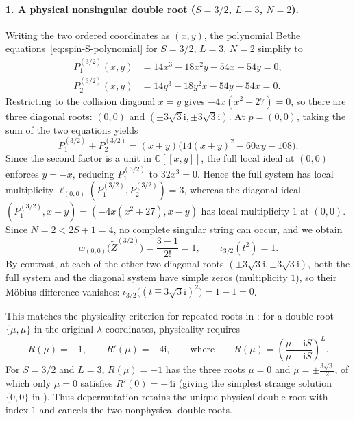 \documentclass[11pt]{article}
\theoremstyle{definition}
\newcommand{\ii}{\mathrm{i}}
\newcommand{\C}{\mathbb{C}}
\begin{document}
\paragraph{1. A physical nonsingular double root ($S=3/2$, $L=3$, $N=2$).}
Writing the two ordered coordinates as $(x,y)$, the polynomial Bethe equations~\eqref{eq:spin-S-polynomial} for $S=3/2$, $L=3$, $N=2$ simplify to
\[
 \begin{aligned}
 P_1^{(3/2)}(x,y)&=14x^3-18x^2y-54x-54y=0,\\
 P_2^{(3/2)}(x,y)&=14y^3-18y^2x-54y-54x=0.
 \end{aligned}
\]
Restricting to the collision diagonal $x=y$ gives $-4x(x^2+27)=0$, so there are three diagonal roots: $(0,0)$ and $(\pm 3\sqrt{3}\ii,\pm 3\sqrt{3}\ii)$.
At $p=(0,0)$, taking the sum of the two equations yields
\[
 P_1^{(3/2)}+P_2^{(3/2)}
 =(x+y)\bigl(14(x+y)^2-60xy-108\bigr).
\]
Since the second factor is a unit in $\C[[x,y]]$, the full local ideal at $(0,0)$ enforces $y=-x$, reducing $P_1^{(3/2)}$ to $32x^3=0$. Hence the full system has local multiplicity $\ell_{(0,0)}(P_1^{(3/2)},P_2^{(3/2)})=3$, whereas the diagonal ideal $(P_1^{(3/2)},x-y)=(-4x(x^2+27),x-y)$ has local multiplicity $1$ at $(0,0)$. Since $N=2<2S+1=4$, no complete singular string can occur, and we obtain
\[
 w_{(0,0)}\bigl(\tilde{Z}^{(3/2)}\bigr)=\frac{3-1}{2!}=1,
 \qquad \iota_{3/2}(t^2)=1.
\]
By contrast, at each of the other two diagonal roots $(\pm 3\sqrt{3}\ii,\pm 3\sqrt{3}\ii)$, both the full system and the diagonal system have simple zeros (multiplicity $1$), so their M\"obius difference vanishes: $\iota_{3/2}\bigl((t\mp 3\sqrt{3}\ii)^2\bigr)=1-1=0$.

This matches the physicality criterion for repeated roots in \cite[Section~3.2, eq.~(3.2), and Appendix~B.1]{HNS2014}: for a double root $\{\mu,\mu\}$ in the original $\lambda$-coordinates, physicality requires
\[
 R(\mu)=-1,\qquad R'(\mu)=-4\ii,\qquad\text{where}\qquad
 R(\mu)=\left(\frac{\mu-\ii S}{\mu+\ii S}\right)^L.
\]
For $S=3/2$ and $L=3$, $R(\mu)=-1$ has the three roots $\mu=0$ and $\mu=\pm\frac{3\sqrt{3}}{2}$, of which only $\mu=0$ satisfies $R'(0)=-4\ii$ (giving the simplest strange solution $\{0,0\}$ in \cite[Table~5]{HNS2014}). Thus depermutation retains the unique physical double root with index $1$ and cancels the two nonphysical double roots.
\end{document}

